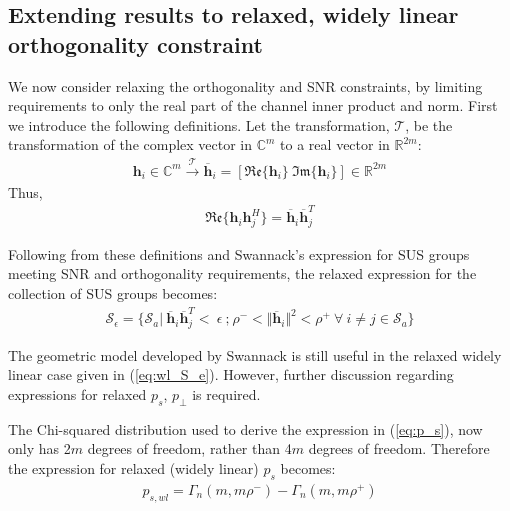 \subsection{Extending results to relaxed, widely linear orthogonality constraint}
We now consider relaxing the orthogonality and SNR constraints, by limiting  requirements to only the real part of the channel inner product and norm. First we introduce the following definitions. Let the  transformation, $\mathcal{T}$, be the transformation of the complex vector in $\mathbb{C}^m$ to a real vector in $\mathbb{R}^{2m}$:
\begin{equation}\label{eq:complex_real_xform}
    \begin{aligned}
        \textbf{h}_i \in \mathbb{C}^m \xrightarrow{\mathcal{T}} \overline{\textbf{h}}_i = [ \mathfrak{Re} \lbrace \textbf{h}_i \rbrace \ \mathfrak{Im}\lbrace \textbf{h}_i \rbrace ] \in \mathbb{R}^{2m}
    \end{aligned}
\end{equation}
Thus,
\begin{equation}\label{eq:orth_real_transp}
    \begin{aligned}
        \mathfrak{Re} \lbrace \textbf{h}_i\textbf{h}_j^H \rbrace = \overline{\textbf{h}}_i \overline{\textbf{h}}_j^T 
    \end{aligned}
\end{equation}

Following from these definitions and Swannack's expression for SUS groups meeting SNR and orthogonality requirements, the relaxed expression for the collection of SUS groups becomes:
\begin{equation}\label{eq:wl_S_e}
    \begin{aligned}
        \mathcal{S}_\epsilon = \lbrace \mathcal{S}_a \big|\  \overline{\textbf{h}}_i \overline{\textbf{h}}_j^T<\ \epsilon \ \text{;} \ \rho^-<\Vert \overline{\textbf{h}}_i \Vert^2 < \rho^+\ \forall \ i \neq j \in \mathcal{S}_a \rbrace
    \end{aligned}
\end{equation}

The geometric model developed by Swannack is still useful in the relaxed widely linear case given in (\ref{eq:wl_S_e}). However, further discussion regarding expressions for relaxed $p_s$, $p_\perp$ is required.

The Chi-squared distribution used to derive the expression in (\ref{eq:p_s}), now only has 2$m$ degrees of freedom, rather than 4$m$ degrees of freedom. Therefore the expression for relaxed (widely linear) $p_s$ becomes:
\begin{equation}\label{eq:p_s_real}
    \begin{aligned}
        p_{s,wl} = \Gamma_n(m,m\rho^-) - \Gamma_n(m,m\rho^+)
    \end{aligned}
\end{equation}

